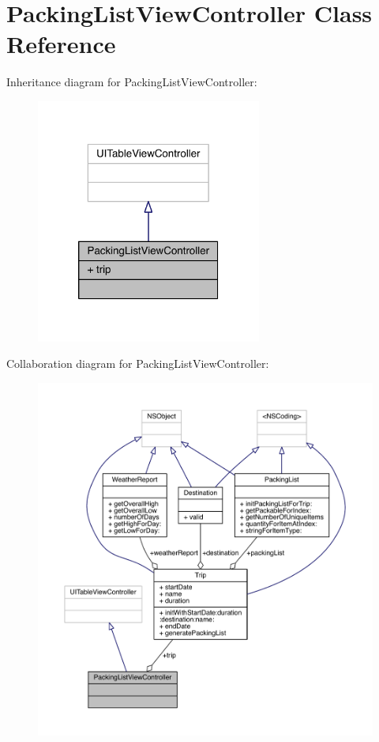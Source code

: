 \hypertarget{interface_packing_list_view_controller}{\section{Packing\-List\-View\-Controller Class Reference}
\label{interface_packing_list_view_controller}
}


Inheritance diagram for Packing\-List\-View\-Controller\-:\nopagebreak
\begin{figure}[H]
\begin{center}
\leavevmode
\includegraphics[width=210pt]{interface_packing_list_view_controller__inherit__graph}
\end{center}
\end{figure}


Collaboration diagram for Packing\-List\-View\-Controller\-:\nopagebreak
\begin{figure}[H]
\begin{center}
\leavevmode
\includegraphics[width=350pt]{interface_packing_list_view_controller__coll__graph}
\end{center}
\end{figure}
